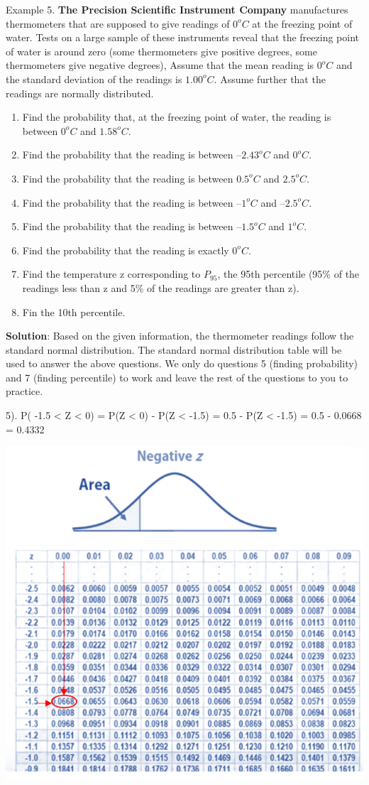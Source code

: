 \documentclass[
]{book}
\begin{document}
\hfill\break

Example 5. \textbf{The Precision Scientific Instrument Company} manufactures thermometers that are supposed to give readings of \(0^oC\) at the freezing point of water. Tests on a large sample of these instruments reveal that the freezing point of water is around zero (some thermometers give positive degrees, some thermometers give negative degrees), Assume that the mean reading is \(0^oC\) and the standard deviation of the readings is \(1.00^oC\). Assume further that the readings are normally distributed.

\begin{enumerate}
\def\labelenumi{\arabic{enumi}.}
\item
  Find the probability that, at the freezing point of water, the reading is between \(0^oC\) and \(1.58^oC\).
\item
  Find the probability that the reading is between \(–2.43^oC\) and \(0^oC\).
\item
  Find the probability that the reading is between \(0.5^oC\) and \(2.5^oC\).
\item
  Find the probability that the reading is between \(–1^oC\) and \(–2.5^oC\).
\item
  Find the probability that the reading is between \(–1.5^oC\) and \(1^oC\).
\item
  Find the probability that the reading is exactly \(0^oC\).
\item
  Find the temperature z corresponding to \(P_{95}\), the 95th percentile (95\% of the readings less than z and 5\% of the readings are greater than z).
\item
  Fin the 10th percentile.
\end{enumerate}

\textbf{Solution}: Based on the given information, the thermometer readings follow the standard normal distribution. The standard normal distribution table will be used to answer the above questions. We only do questions 5 (finding probability) and 7 (finding percentile) to work and leave the rest of the questions to you to practice.

5). P( -1.5 \textless{} Z \textless{} 0) = P(Z \textless{} 0) - P(Z \textless{} -1.5) = 0.5 - P(Z \textless{} -1.5) = 0.5 - 0.0668 = 0.4332

\begin{center}\includegraphics[width=0.6\linewidth]{week04/example05-5} \end{center}
\end{document}
